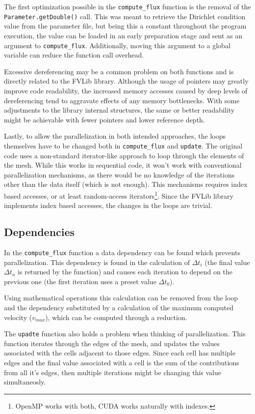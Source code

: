 \documentclass[9pt,twocolumn]{scrartcl}
\begin{document}
The first optimization possible in the \texttt{compute\_flux} function is the removal of the \texttt{Parameter.getDouble()} call. This was meant to retrieve the Dirichlet condition value from the parameter file, but being this a constant throughout the program execution, the value can be loaded in an early preparation stage and sent as an argument to \texttt{compute\_flux}. Additionally, moving this argument to a global variable can reduce the function call overhead.

Excessive dereferencing may be a common problem on both functions and is directly related to the FVLib library. Although the usage of pointers may greatly improve code readability, the increased memory accesses caused by deep levels of dereferencing tend to aggravate effects of any memory bottlenecks. With some adjustments to the library internal structures, the same or better readability might be achievable with fewer pointers and lower reference depth.

Lastly, to allow the parallelization in both intended approaches, the loops themselves have to be changed both in \texttt{compute\_flux} and \texttt{update}. The original code uses a non-standard iterator-like approach to loop through the elements of the mesh. While this works in sequential code, it won't work with conventional parallelization mechanisms, as there would be no knowledge of the iterations other than the data itself (which is not enough). This mechanisms requires index based accesses, or at least random-access iterators\footnote{OpenMP works with both, CUDA works naturally with indexes.}. Since the FVLib library implements index based accesses, the changes in the loops are trivial.

\subsection{Dependencies}
In the \texttt{compute\_flux} function a data dependency can be found which prevents parallelization. This dependency is found in the calculation of $\Delta t_{i}$ (the final value $\Delta t_{n}$ is returned by the function) and causes each iteration to depend on the previous one (the first iteration uses a preset value $\Delta t_{0}$).

Using mathematical operations this calculation can be removed from the loop and the dependency substituted by a calculation of the maximum computed velocity ($v_{max}$), which can be computed through a reduction.

The \texttt{upadte} function also holds a problem when thinking of parallelization. This function iterates through the edges of the mesh, and updates the values associated with the cells adjacent to those edges. Since each cell has multiple edges and the final value associated with a cell is the sum of the contributions from all it's edges, then multiple iterations might be changing this value simultaneosly.
\end{document}
